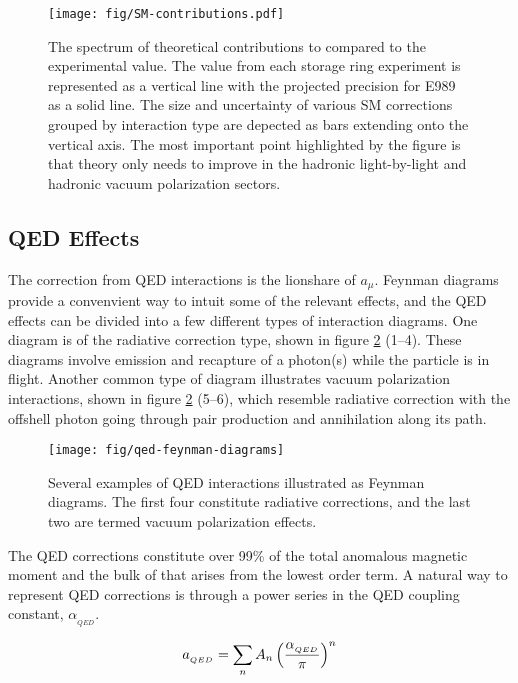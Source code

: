 \begin{figure}
\texttt{[image: fig/SM-contributions.pdf]}
\label{fig:sm-contributions}
\caption{The spectrum of theoretical contributions to \mugmtwo compared to the experimental value.  The value from each storage ring experiment is represented as a vertical line with the projected precision for E989 as a solid line.  The size and uncertainty of various SM corrections grouped by interaction type are depected as bars extending onto the vertical axis. The most important point highlighted by the figure is that theory only needs to improve in the hadronic light-by-light and hadronic vacuum polarization sectors.}
\end{figure}

\subsection{QED Effects} \label{s-sec:theory-qed}

The correction from QED interactions is the lionshare of $a_\mu$.  Feynman diagrams provide a convenvient way to intuit some of the relevant effects, and the QED effects can be divided into a few different types of interaction diagrams.  One diagram is of the radiative correction type, shown in figure \ref{fig:qed-feynman-diagrams} (1\hbox{--}4).  These diagrams involve emission and recapture of a photon(s) while the particle is in flight.  Another common type of diagram illustrates vacuum polarization interactions, shown in figure \ref{fig:qed-feynman-diagrams} (5\hbox{--}6), which resemble radiative correction with the offshell photon going through pair production and annihilation along its path.

\begin{figure}
\label{fig:qed-feynman-diagrams}
\texttt{[image: fig/qed-feynman-diagrams]}
\caption{Several examples of QED interactions illustrated as Feynman diagrams.  The first four constitute radiative corrections, and the last two are termed vacuum polarization effects. }
\end{figure}

The QED corrections constitute over 99\% of the total anomalous magnetic moment and the bulk of that arises from the lowest order term.  A natural way to represent QED corrections is through a power series in the QED coupling constant, $\alpha_{_{QED}}$.

\begin{equation}
\label{eqn:qed-correction-series}
a_{_{QED}} = \sum_n{A_n \left(\frac{\alpha_{_{QED}}}{\pi} \right)^n}
\end{equation}

